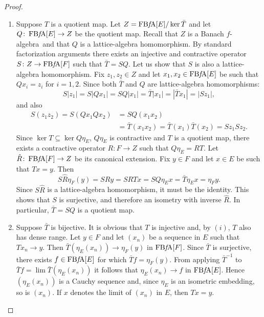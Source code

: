 \documentclass{memo-l}
\theoremstyle{definition}
\theoremstyle{remark}
\numberwithin{section}{chapter}
\numberwithin{equation}{chapter}
\newcommand{\falg}{$f\!$-algebra}
\newcommand{\FBFA}[1]{\operatorname{FB{\it f}\!A}[#1]}
\begin{document}
\begin{proof}
\begin{enumerate}
        \item Suppose $T$ is a quotient map. Let $Z=\FBFA E/\ker \bar{T}$ and
            let $Q\colon \FBFA E\to Z$ be the quotient map. Recall
            that $Z$ is a Banach \falg\ and that $Q$ is a
            lattice-algebra homomorphism. By standard factorization
            arguments there exists an injective and contractive
            operator $S\colon Z\to \FBFA F$ such that $\bar{T}=SQ$.
            Let us show that $S$ is also a lattice-algebra
            homomorphism. Fix $z_1,z_2 \in Z$ and let $x_1,x_2 \in
            \FBFA E$ be such that $Qx_i=z_i$ for $i=1,2$. Since both
            $\bar{T}$ and $Q$ are lattice-algebra homomorphisms:
            \[
            S|z_1|=S|Qx_1|=SQ|x_1|=\bar{T}|x_1|=|\bar{T}x_1|=|Sz_1|,
            \]
            and also
            \begin{align*}
                S(z_1z_2)=S(Qx_1Qx_2)&=SQ(x_1x_2)\\&=\bar{T}(x_1x_2)=\bar{T}(x_1)\bar{T}(x_2)=Sz_1
            Sz_2.
            \end{align*}
            Since $\ker T\subseteq \ker Q\eta _E$, $Q \eta _E$ is
            contractive and $T$ is a quotient map, there exists a
            contractive operator $R\colon F\to Z$ such that $Q\eta _E=RT$. Let
            $\hat{R}\colon \FBFA F\to Z$ be its canonical extension.
            Fix $y \in F$ and let $x \in E$ be such that $Tx=y$. Then
            \[
            S \hat{R}\eta_F(y)=SRy=SRTx=SQ\eta _E x=\bar{T}\eta
            _Ex=\eta _Fy.
            \]
            Since $S \hat{R}$ is a lattice-algebra homomorphism, it
            must be the identity. This shows that $S$ is surjective,
            and therefore an isometry with inverse $\hat{R}$. In
            particular, $\bar{T}=SQ$ is a quotient map.
        \item Suppose $\bar{T}$ is bijective. It is obvious that $T$
            is injective and, by $(i)$, $T$ also has dense range.
            Let $y \in F$ and let $(x_n)$ be a sequence in $E$ such
            that $Tx_n\to y$. Then $\bar{T}(\eta _E(x_n))\to
            \eta _F(y)$ in $\FBFA F$. Since $\bar{T}$ is surjective,
            there exists $f \in \FBFA E$ for which $\bar{T}f=\eta
            _F(y)$. From applying $\bar{T}^{-1}$ to $\bar{T}f=\lim
            \bar{T}(\eta _E(x_n))$ it follows that $\eta _E(x_n)\to f$
            in $\FBFA E$. Hence $(\eta _E(x_n))$ is a Cauchy sequence
            and, since $\eta _E$ is an isometric embedding, so is
            $(x_n)$. If $x$ denotes the limit of $(x_n)$ in $E$, then
            $Tx=y$.


\end{enumerate}
\end{proof}
\end{document}
